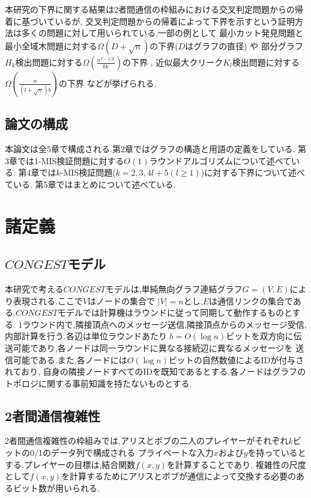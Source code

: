\documentclass[12pt]{thesis}
\theoremstyle{definition}
\begin{document}
本研究の下界に関する結果は2者間通信の枠組みにおける交叉判定問題からの帰着に基づいているが,
交叉判定問題からの帰着によって下界を示すという証明方法は多くの問題に対して用いられている.一部の例として
最小カット発見問題と最小全域木問題に対する$\Omega (D + \sqrt{n})$の下界($D$はグラフの直径) \cite{sarma2012distributed}や
部分グラフ$H_{k}$検出問題に対する$\Omega \left(\frac{n^{2 - 1/k}}{bk}\right)$の下界 \cite{fischer2018possibilities},
近似最大クリーク$K_{l}$検出問題に対する$\Omega \left(\frac{n}{(l + \sqrt{n})b}\right)$の下界 \cite{czumaj2020detecting}などが挙げられる.

\section{論文の構成}
本論文は全5章で構成される.第2章ではグラフの構造と用語の定義をしている.
第3章では1-MIS検証問題に対する$O(1)$ラウンドアルゴリズムについて述べている.
第4章では$k$-MIS検証問題($k = 2, 3, 4l + 5 ( l \geq 1)$)に対する下界について述べている.
第5章ではまとめについて述べている.

\chapter{諸定義}

\section{$CONGEST$モデル}
本研究で考える$CONGEST$モデルは,単純無向グラフ連結グラフ$G = (V, E)$により表現される.ここで$V$はノードの集合で
$|V| = n$とし,$E$は通信リンクの集合である.$CONGEST$モデルでは計算機はラウンドに従って同期して動作するものとする.
1ラウンド内で,隣接頂点へのメッセージ送信,隣接頂点からのメッセージ受信,内部計算を行う.各辺は単位ラウンドあたり
$b = O(\log n)$ビットを双方向に伝送可能であり,各ノードは同一ラウンドに異なる接続辺に異なるメッセージを
送信可能である.また,各ノードには$O(\log n)$ビットの自然数値によるIDが付与されており,
自身の隣接ノードすべてのIDを既知であるとする.各ノードはグラフのトポロジに関する事前知識を持たないものとする.

\section{2者間通信複雑性}
2者間通信複雑性の枠組みでは,アリスとボブの二人のプレイヤーがそれぞれ$k$ビットの0/1のデータ列で構成される
プライベートな入力$x$および$y$を持っているとする.プレイヤーの目標は,結合関数$f(x, y)$を計算することであり,
複雑性の尺度として$f(x, y)$を計算するためにアリスとボブが通信によって交換する必要のあるビット数が用いられる.
\end{document}
